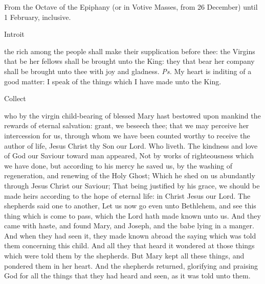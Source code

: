 \begin{rubric}
    {From the Octave of the Epiphany (or in Votive Masses, from 26 December) until 1 February, inclusive.}
\end{rubric}
\begin{inhead}
    Introit
\end{inhead}
 the rich among the people shall make their supplication before thee: the Virgins that be her fellows shall be brought unto the King: they that bear her company shall be brought unto thee with joy and gladness. \textit{Ps.} My heart is inditing of a good matter: I speak of the things which I have made unto the King.
\begin{inhead}
    Collect
\end{inhead}
 who by the virgin child-bearing of blessed Mary hast bestowed upon mankind the rewards of eternal salvation: grant, we beseech thee; that we may perceive her intercession for us, through whom we have been counted worthy to receive the author of life, Jesus Christ thy Son our Lord. Who liveth.
 The kindness and love of God our Saviour toward man appeared, Not by works of righteousness which we have done, but according to his mercy he saved us, by the washing of regeneration, and renewing of the Holy Ghost; Which he shed on us abundantly through Jesus Christ our Saviour; That being justified by his grace, we should be made heirs according to the hope of eternal life:
in Christ Jesus our Lord.
 The shepherds said one to another, Let us now go even unto Bethlehem, and see this thing which is come to pass, which the Lord hath made known unto us. And they came with haste, and found Mary, and Joseph, and the babe lying in a manger. And when they had seen it, they made known abroad the saying which was told them concerning this child. And all they that heard it wondered at those things which were told them by the shepherds. But Mary kept all these things, and pondered them in her heart. And the shepherds returned, glorifying and praising God for all the things that they had heard and seen, as it was told unto them.

